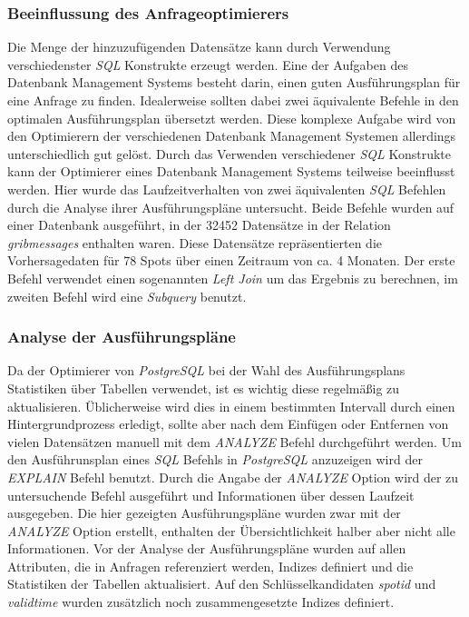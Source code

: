 \subsubsection{Beeinflussung des Anfrageoptimierers}
Die Menge der hinzuzufügenden Datensätze kann durch Verwendung
verschiedenster \textit{SQL} Konstrukte erzeugt werden. Eine der
Aufgaben des Datenbank Management Systems besteht darin, einen guten
Ausführungsplan für eine Anfrage zu finden. Idealerweise sollten dabei
zwei äquivalente Befehle in den optimalen Ausführungsplan übersetzt
werden. Diese komplexe Aufgabe wird von den Optimierern der
verschiedenen Datenbank Management Systemen allerdings unterschiedlich
gut gelöst. Durch das Verwenden verschiedener \textit{SQL} Konstrukte
kann der Optimierer eines Datenbank Management Systems teilweise
beeinflusst werden. Hier wurde das Laufzeitverhalten von zwei
äquivalenten \textit{SQL} Befehlen durch die Analyse ihrer
Ausführungspläne untersucht. Beide Befehle wurden auf einer Datenbank
ausgeführt, in der 32452 Datensätze in der Relation
\textit{grib\textunderscore messages} enthalten waren. Diese
Datensätze repräsentierten die Vorhersagedaten für 78 Spots über einen
Zeitraum von ca. 4 Monaten. Der erste Befehl verwendet einen
sogenannten \textit{Left Join} um das Ergebnis zu berechnen, im
zweiten Befehl wird eine \textit{Subquery} benutzt.

\subsubsection{Analyse der Ausführungspläne}
Da der Optimierer von \textit{PostgreSQL} bei der Wahl des
Ausführungsplans Statistiken über Tabellen verwendet, ist es wichtig
diese regelmäßig zu aktualisieren. Üblicherweise wird dies in einem
bestimmten Intervall durch einen Hintergrundprozess erledigt, sollte
aber nach dem Einfügen oder Entfernen von vielen Datensätzen manuell
mit dem \textit{ANALYZE} Befehl durchgeführt werden. Um den
Ausführunsplan eines \textit{SQL} Befehls in \textit{PostgreSQL}
anzuzeigen wird der \textit{EXPLAIN} Befehl benutzt. Durch die Angabe
der \textit{ANALYZE} Option wird der zu untersuchende Befehl
ausgeführt und Informationen über dessen Laufzeit ausgegeben. Die hier
gezeigten Ausführungspläne wurden zwar mit der \textit{ANALYZE} Option
erstellt, enthalten der Übersichtlichkeit halber aber nicht alle
Informationen. Vor der Analyse der Ausführungspläne wurden auf allen
Attributen, die in Anfragen referenziert werden, Indizes definiert und
die Statistiken der Tabellen aktualisiert. Auf den Schlüsselkandidaten
\textit{spot\textunderscore id} und \textit{valid\textunderscore time}
wurden zusätzlich noch zusammengesetzte Indizes definiert.

